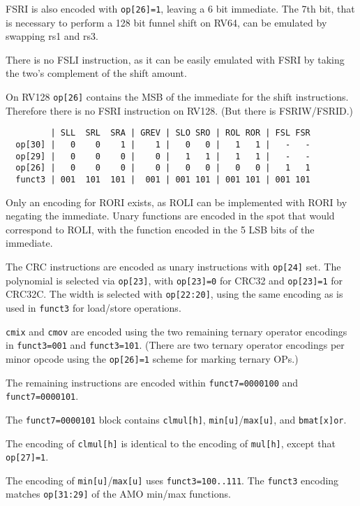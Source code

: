 FSRI is also encoded with {\tt op[26]=1}, leaving a 6 bit immediate. The 7th
bit, that is necessary to perform a 128 bit funnel shift on RV64, can be
emulated by swapping rs1 and rs3.

There is no FSLI instruction, as it can be easily emulated with FSRI by taking the
two's complement of the shift amount.

On RV128 {\tt op[26]} contains the MSB of the immediate for the shift instructions.
Therefore there is no FSRI instruction on RV128. (But there is FSRIW/FSRID.)

\begin{minipage}{\linewidth}
\begin{verbatim}
         | SLL  SRL  SRA | GREV | SLO SRO | ROL ROR | FSL FSR
  op[30] |   0    0    1 |    1 |   0   0 |   1   1 |   -   -
  op[29] |   0    0    0 |    0 |   1   1 |   1   1 |   -   -
  op[26] |   0    0    0 |    0 |   0   0 |   0   0 |   1   1
  funct3 | 001  101  101 |  001 | 001 101 | 001 101 | 001 101
\end{verbatim}
\end{minipage}

Only an encoding for RORI exists, as ROLI can be implemented with RORI by negating
the immediate. Unary functions are encoded in the spot that would correspond to ROLI,
with the function encoded in the 5 LSB bits of the immediate.

The CRC instructions are encoded as unary instructions with {\tt op[24]} set. The
polynomial is selected via {\tt op[23]}, with {\tt op[23]=0} for CRC32 and
{\tt op[23]=1} for CRC32C. The width is selected with {\tt op[22:20]}, using
the same encoding as is used in {\tt funct3} for load/store operations.

{\tt cmix} and {\tt cmov} are encoded using the two remaining ternary operator
encodings in {\tt funct3=001} and {\tt funct3=101}. (There are two ternary
operator encodings per minor opcode using the {\tt op[26]=1} scheme for
marking ternary OPs.)

The remaining instructions are encoded within {\tt funct7=0000100} and
{\tt funct7=0000101}.

The {\tt funct7=0000101} block contains {\tt clmul[h]},
{\tt min[u]}/{\tt max[u]}, and {\tt bmat[x]or}.

The encoding of {\tt clmul[h]} is identical to the encoding of {\tt mul[h]},
except that {\tt op[27]=1}.

The encoding of {\tt min[u]}/{\tt max[u]} uses {\tt funct3=100..111}. The
{\tt funct3} encoding matches {\tt op[31:29]} of the AMO min/max functions.


